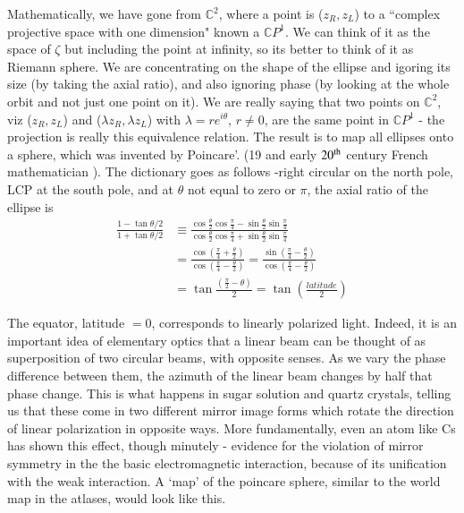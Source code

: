 Mathematically, we have gone from $\mathbb{C}^2$, where a point is ($z_R , z_L$) to a ``complex projective space with one dimension" known a $\mathbb{C}P^1$. We can think of it
as the space of $\zeta$ but including the point at infinity, so its better to think of it
as Riemann sphere. We are concentrating on the shape of the ellipse and
igoring its size (by taking the axial ratio), and also ignoring phase (by looking
at the whole orbit and not just one point on it). We are really saying that two
points on $\mathbb{C}^2$, viz ($z_R , z_L$) and ($\lambda z_R , \lambda z_L$) with $\lambda = re^{i\theta}$, $r\neq 0$, are the same
point in $\mathbb{C}P^1$ - the projection is really this equivalence relation. The result is to
map all ellipses onto a sphere, which was invented by Poincare'. (19 and early
$20^{\rm th}$ century French mathematician ). The dictionary goes as follows -right circular on the north pole, LCP at the south pole, and at $\theta$ not equal to zero or
$\pi$, the axial ratio of the ellipse is
\begin{align*}
\frac{1-\tan \theta /2}{1+ \tan \theta /2} & \equiv \frac{\cos \frac{\theta}{2} \cos \frac{\pi}{4} - \sin \frac{\theta}{2} \sin \frac{\pi}{4}}{\cos \frac{\theta}{2} \cos \frac{\pi}{4} + \sin \frac{\theta}{2} \sin \frac{\pi}{4}}\\
& = \frac{\cos (\frac{\pi}{4} + \frac{\theta}{2})}{\cos (\frac{\pi}{4} - \frac{\theta}{2})} = \frac{\sin (\frac{\pi}{4} -\frac{\theta}{2})}{\cos (\frac{\pi}{4} - \frac{\theta }{2})}\\
& = \tan \frac{(\frac{\pi}{2} -\theta)}{2} = \tan \left(\frac{latitude}{2} \right)
\end{align*}

The equator, latitude $= 0$, corresponds to linearly polarized light. Indeed,
it is an important idea of elementary optics that a linear beam can be thought
of as superposition of two circular beams, with opposite senses. As we vary the
phase difference between them, the azimuth of the linear beam changes by half
that phase change. This is what happens in sugar solution and quartz crystals,
telling us that these come in two different mirror image forms which rotate the
direction of linear polarization in opposite ways. More fundamentally, even an
atom like Cs has shown this effect, though minutely - evidence for the violation
of mirror symmetry in the the basic electromagnetic interaction, because of its
unification with the weak interaction. A `map' of the poincare sphere, similar
to the world map in the atlases, would look like this.
\bigskip

